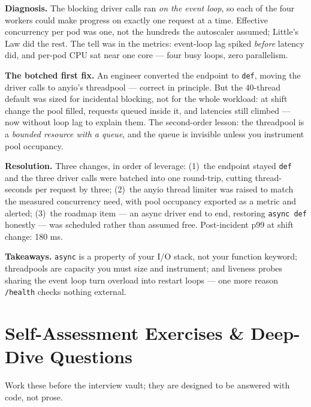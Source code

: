 \textbf{Diagnosis.} The blocking driver calls ran \emph{on the event loop},
so each of the four workers could make progress on exactly one request at a
time. Effective concurrency per pod was one, not the hundreds the autoscaler
assumed; Little's Law did the rest. The tell was in the metrics: event-loop
lag spiked \emph{before} latency did, and per-pod CPU sat near one core ---
four busy loops, zero parallelism.

\textbf{The botched first fix.} An engineer converted the endpoint to
\texttt{def}, moving the driver calls to anyio's threadpool --- correct in
principle. But the 40-thread default was sized for incidental blocking, not
for the whole workload: at shift change the pool filled, requests queued
inside it, and latencies still climbed --- now without loop lag to explain
them. The second-order lesson: the threadpool is a \emph{bounded resource
with a queue}, and the queue is invisible unless you instrument pool
occupancy.

\textbf{Resolution.} Three changes, in order of leverage: (1)~the endpoint
stayed \texttt{def} and the three driver calls were batched into one
round-trip, cutting thread-seconds per request by three; (2)~the anyio
thread limiter was raised to match the measured concurrency need, with pool
occupancy exported as a metric and alerted; (3)~the roadmap item --- an
async driver end to end, restoring \texttt{async def} honestly --- was
scheduled rather than assumed free. Post-incident p99 at shift change: 180 ms.

\textbf{Takeaways.} \texttt{async} is a property of your I/O stack, not your
function keyword; threadpools are capacity you must size and instrument; and
liveness probes sharing the event loop turn overload into restart loops ---
one more reason \texttt{/health} checks nothing external.

\section{Self-Assessment Exercises \& Deep-Dive Questions}
\label{sec:ch6-self-assessment}

Work these before the interview vault; they are designed to be answered with
code, not prose.

